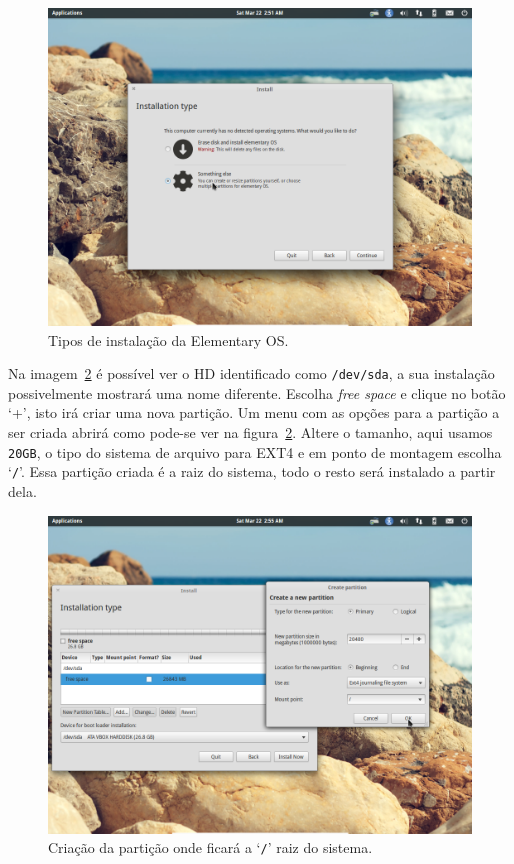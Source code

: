 \documentclass{handout_utfpr}
\begin{document}
\begin{figure}[H]
  \centering
  \includegraphics[scale=.3]{imagens/elementary-install-03.png}
  \caption{Tipos de instalação da Elementary OS\@.}
  \label{fig:elementary-install}
\end{figure}

Na imagem~\ref{fig:elementary-root} é possível ver o HD identificado como \texttt{/dev/sda}, a sua instalação possivelmente mostrará uma nome diferente. Escolha \textit{free space} e clique no botão `+', isto irá criar uma nova partição. Um menu com as opções para a partição a ser criada abrirá como pode-se ver na figura~\ref{fig:elementary-root}. Altere o tamanho, aqui usamos \texttt{20GB}, o tipo do sistema de arquivo para EXT4 e em ponto de montagem escolha `\texttt{/}'. Essa partição criada é a raiz do sistema, todo o resto será instalado a partir dela.

\begin{figure}[H]
  \centering
  \includegraphics[scale=.3]{imagens/elementary-install-05.png}
  \caption{Criação da partição onde ficará a `\texttt{/}' raiz do sistema.}
  \label{fig:elementary-root}
\end{figure}
\end{document}
